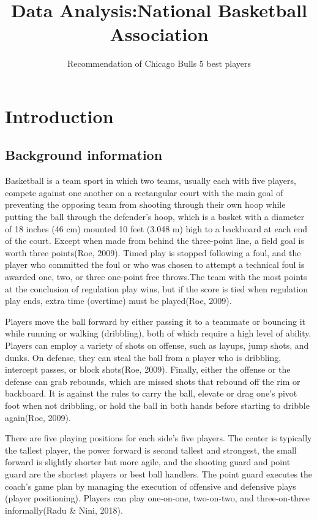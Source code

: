 \documentclass[
]{article}
\title{Data Analysis:National Basketball Association}
\subtitle{Recommendation of Chicago Bulls 5 best players}
\author{}
\date{\vspace{-2.5em}}
\begin{document}
\maketitle

{
\setcounter{tocdepth}{3}
\tableofcontents
}
\hypertarget{introduction}{%
\section{Introduction}\label{introduction}}

\hypertarget{background-information}{%
\subsection{Background information}\label{background-information}}

Basketball is a team sport in which two teams, usually each with five
players, compete against one another on a rectangular court with the
main goal of preventing the opposing team from shooting through their
own hoop while putting the ball through the defender's hoop, which is a
basket with a diameter of 18 inches (46 cm) mounted 10 feet (3.048 m)
high to a backboard at each end of the court. Except when made from
behind the three-point line, a field goal is worth three points(Roe,
2009). Timed play is stopped following a foul, and the player who
committed the foul or who was chosen to attempt a technical foul is
awarded one, two, or three one-point free throws.The team with the most
points at the conclusion of regulation play wins, but if the score is
tied when regulation play ends, extra time (overtime) must be
played(Roe, 2009).

Players move the ball forward by either passing it to a teammate or
bouncing it while running or walking (dribbling), both of which require
a high level of ability. Players can employ a variety of shots on
offense, such as layups, jump shots, and dunks. On defense, they can
steal the ball from a player who is dribbling, intercept passes, or
block shots(Roe, 2009). Finally, either the offense or the defense can
grab rebounds, which are missed shots that rebound off the rim or
backboard. It is against the rules to carry the ball, elevate or drag
one's pivot foot when not dribbling, or hold the ball in both hands
before starting to dribble again(Roe, 2009).

There are five playing positions for each side's five players. The
center is typically the tallest player, the power forward is second
tallest and strongest, the small forward is slightly shorter but more
agile, and the shooting guard and point guard are the shortest players
or best ball handlers. The point guard executes the coach's game plan by
managing the execution of offensive and defensive plays (player
positioning). Players can play one-on-one, two-on-two, and
three-on-three informally(Radu \& Nini, 2018).
\end{document}
